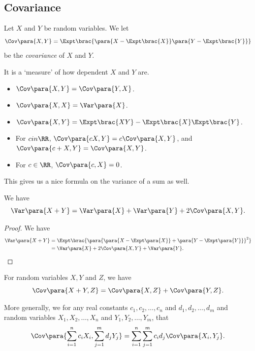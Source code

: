 \subsection{Covariance}

\begin{definition}[Covariance]
    \label{def:covariance}%
    Let \(X\) and \(Y\) be random variables. We let
    \[
        \Cov\para{X, Y} = \Expt\brac{\para{X - \Expt\brac{X}} \para{Y - \Expt\brac{Y}}}
    \]
    be the \emph{covariance} of \(X\) and \(Y\).
\end{definition}

It is a `measure' of how dependent \(X\) and \(Y\) are.

\begin{proposition}
    \label{prop:properties-of-covariance}%
    \begin{itemize}
        \item \(\Cov\para{X, Y} = \Cov\para{Y, X}\). 
        \item \(\Cov\para{X, X} = \Var\para{X}\).
        \item \(\Cov\para{X, Y} = \Expt\brac{X Y} - \Expt\brac{X} \Expt\brac{Y}\).
        \item For \(c in \RR\), \(\Cov\para{cX, Y} = c \Cov\para{X, Y}\), and \(\Cov\para{c + X, Y} = \Cov\para{X, Y}\).
        \item For \(c \in \RR\), \(\Cov\para{c, X} = 0\).
    \end{itemize}
\end{proposition}

This gives us a nice formula on the variance of a sum as well.

\begin{proposition}
    \label{prop:variance-of-sum}%
    We have
    \[
        \Var\para{X + Y} = \Var\para{X} + \Var\para{Y} + 2 \Cov\para{X, Y}.
    \]    
\end{proposition}

\begin{proof}
    We have
    \begin{align*}
        \Var\para{X + Y} &= \Expt\brac{\para{\para{X - \Expt\para{X}} + \para{Y - \Expt\para{Y}}}^2} \\
        &= \Var\para{X} + 2 \Cov\para{X, Y} + \Var\para{Y}.
    \end{align*}
\end{proof}

\begin{proposition}
    \label{prop:linearity-of-covariance}%
    For random variables \(X, Y\) and \(Z\), we have
    \[
        \Cov\para{X + Y, Z} = \Cov\para{X, Z} + \Cov\para{Y, Z}.
    \]

    More generally, we for any real constants  \(c_1, c_2, \ldots, c_n\) and \(d_1, d_2, \ldots, d_m\) and random variables \(X_1, X_2, \ldots, X_n\) and \(Y_1, Y_2, \ldots, Y_m\), that
    \[
        \Cov\para{\sum_{i = 1}^{n} c_i X_i, \sum_{j = 1}^{m} d_j Y_j} = \sum_{i = 1}^{n} \sum_{j = 1}^{m} c_i d_j \Cov\para{X_i, Y_j}.
    \]
\end{proposition}

